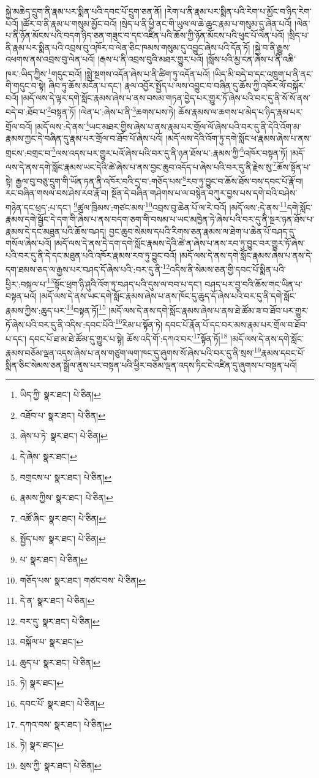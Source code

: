 སྐྱེ་མཆེད་དྲུག་ནི་རྣམ་པར་སྨིན་པའི་དབང་པོ་དྲུག་ཅན་ནོ། །རེག་པ་ནི་རྣམ་པར་སྨིན་པའི་རེག་པ་མྱོང་བ་ཉིད་རེག་པའོ། །ཚོར་བ་ནི་རྣམ་པ་གསུམ་མྱོང་བའོ། །སྲེད་པ་ནི་ཕྱི་ནང་གི་ཡུལ་ལ་ཆེ་ཆུང་རྣམ་པ་གསུམ་དུ་ཞེན་པའོ། །ལེན་པ་ནི་ཉོན་མོངས་པའི་བདག་ཉིད་ཅན་གཟུང་བ་དང་འཛིན་པའི་ཆོས་ཀྱི་ཉོན་མོངས་པའི་ཕུང་པོ་ལེན་པའོ། །སྲིད་པ་ནི་རྣམ་པར་སྨིན་པའི་འབྲས་བུ་འཁོར་བ་ལེན་ཅིང་ཁམས་གསུམ་དུ་འབྱུང་ཞེས་པའི་དོན་ཏོ། །སྐྱེ་བ་ནི་རྒྱུས་འཕགས་ནས་འབྲས་བུ་ལེན་པའོ། །རྒས་པ་ནི་འབྲས་བུའི་མཐར་གྱུར་པའོ། །སློས་པའི་མྱ་ངན་ཞེས་པ་ནི་འཆི་ཁར་:ཡིད་ཀྱིས་\footnote{ཡིད་ཀྱི་  སྣར་ཐང་།  པེ་ཅིན། }གདུང་བའོ། །སྨྲེ་སྔགས་འདོན་ཞེས་པ་ནི་ཚིག་ཏུ་འདོན་པའོ། །ཡིད་མི་བདེ་བ་དང་འཁྲུག་པ་ནི་ནང་གི་གདུང་བ་སྟེ། ཞིབ་ཏུ་ཆོས་མངོན་པ་དང་། རྣལ་འབྱོར་སྤྱོད་པ་ལས་འབྱུང་བ་བཞིན་དུ་ཆོས་ཀྱི་འཁོར་ལོ་བསྐོར་བའོ། །མདོ་ལས་དེ་ལྟར་དགེ་སློང་རྣམས་ཞེས་པ་ནས་བསམ་གཏན་བྱེད་པར་གྱུར་ཏོ་ཞེས་པའི་བར་དུ་ནི་སོ་སོ་ནས་བདེ་བ་:ཐོབ་པ་\footnote{འཐོབ་པ་  སྣར་ཐང་།  པེ་ཅིན། }བསྟན་ཏོ། །ལེན་པ་:ཞེས་པ་ནི་\footnote{ཞེས་པ་ཏེ་  སྣར་ཐང་།  པེ་ཅིན། }ཆགས་པས་ཏེ། ཆོས་རྣམས་ལ་ཆགས་པ་མེད་པ་ཉིད་རྣམ་པར་གྲོལ་བའོ། །མདོ་ལས་:དེ་ནས་\footnote{དེ་ཞེས་  སྣར་ཐང་། }ཡང་མཐར་གྱིས་ཞེས་པ་ནས་རྣམ་པར་གྲོལ་ལོ་ཞེས་པའི་བར་དུ་ནི་དེའི་འོག་མ་རྣམས་ཀྱང་དེ་བཞིན་དུ་རྣམ་པར་གྲོལ་བ་ཐོབ་པོ་ཞེས་པའོ། །མདོ་ལས་དེའི་འོག་ཏུ་དགེ་སློང་ཕ་རྣམས་ཞེས་པ་ནས་གྲངས་:བགྲང་བ་\footnote{བགྲངས་པ་  སྣར་ཐང་།  པེ་ཅིན། }ལས་འདས་པར་གྱུར་པའོ་ཞེས་པའི་བར་དུ་ནི་ཉན་ཐོས་པ་:རྣམས་ཀྱི་\footnote{རྣམས་ཀྱིས་  སྣར་ཐང་།  པེ་ཅིན། }འཁོར་བསྟན་ཏོ། །མདོ་ལས་དེ་ནས་དགེ་སློང་རྣམས་ཡང་དེའི་ཚེ་ཞེས་པ་ནས་བྱང་ཆུབ་འདོད་པ་ཞེས་པའི་བར་དུ་ནི་རྗེས་སུ་\footnote{འཚོ་ཞིང་  སྣར་ཐང་།  པེ་ཅིན། }ཆོས་སྟོན་པ་སྟེ། རྒྱལ་བུ་བཅུ་དྲུག་གི་ཡོན་ཏན་ནི་འཁོར་བའི་དྲ་བ་:གཅོད་པས་\footnote{སྤྱོད་པས་  སྣར་ཐང་།  པེ་ཅིན། }རབ་ཏུ་བྱུང་བ་ཆོས་ཐོས་བས་དབང་པོ་རྣོ་བ། རང་བཞིན་གསལ་བས་ཤེས་རབ་རྣོ་བ། སྔོན་དེ་བཞིན་གཤེགས་པ་ལ་བསྙེན་བཀུར་བྱས་པས་དགེ་བའི་བཤེས་གཉེན་དང་ཕྲད་:པ་དང་། \footnote{པ་  སྣར་ཐང་།  པེ་ཅིན། }ཚུལ་ཁྲིམས་:གཙང་མས་\footnote{གཅོད་པས་  སྣར་ཐང་། གཙང་བས་  པེ་ཅིན། }འབྲས་བུ་ཆེན་པོ་ལ་རེ་བའོ། །མདོ་ལས་:དེ་ནས་\footnote{དེ་ན་  སྣར་ཐང་།  པེ་ཅིན། }དགེ་སློང་རྣམས་དགེ་སྦྱོང་དེ་དག་གི་ཞེས་པ་ནས་བདག་ཅག་གི་བསམ་པ་ཡང་མཁྱེན་ཏེ་ཞེས་པའི་བར་དུ་ནི་སྔར་ཉན་ཐོས་པ་རྣམས་དེ་དང་མཐུན་པའི་ཆོས་བཤད། བྱང་ཆུབ་སེམས་དཔའི་རིགས་ཅན་རྣམས་ལ་ཐེག་པ་ཆེན་པོ་བཤད་དུ་གསོལ་ཞེས་པའོ། །མདོ་ལས་དེ་ནས་དེ་དག་དགེ་སློང་རྣམས་དེའི་ཚེ་ན་ཞེས་པ་ནས་རབ་ཏུ་བྱུང་བར་གྱུར་ཏོ་ཞེས་པའི་བར་དུ་ནི་དེ་དང་མཐུན་པའི་འཁོར་རྣམས་རབ་ཏུ་བྱུང་བའོ། །མདོ་ལས་དེ་ནས་དགེ་སློང་རྣམས་ཞེས་པ་ནས་དེ་དག་ཐམས་ཅད་ལ་རྒྱས་པར་བཤད་དོ་ཞེས་པའི་:བར་དུ་ནི་\footnote{བར་དུ་  སྣར་ཐང་།  པེ་ཅིན། }འདིས་ནི་སེམས་ཅན་གྱི་དབང་པོ་སྨིན་པའི་ཕྱིར་:བསྐལ་པ་\footnote{བསྐོལ་པ་  སྣར་ཐང་། }སྟོང་ཕྲག་ཉི་ཤུའི་འོག་ཏུ་བཤད་པའི་དུས་ལ་བབ་པ་དང་། བཤད་པར་བྱ་བའི་ཆོས་གང་ཡིན་པ་བསྟན་པའོ། །མདོ་ལས་དེ་ནས་ཡང་དགེ་སློང་རྣམས་ཞེས་པ་ནས་ཁོང་དུ་ཆུད་དོ་ཞེས་པའི་བར་དུ་ནི་དགེ་སློང་རྣམས་ཀྱིས་:ཆུད་པར་\footnote{ཆུད་པ་  སྣར་ཐང་།  པེ་ཅིན། }བསྟན་ཏོ།\footnote{ཏེ།  སྣར་ཐང་། } །མདོ་ལས་དེ་ནས་དགེ་སློང་རྣམས་ཞེས་པ་ནས་ཐེ་ཚོམ་ཟ་བ་ཐོབ་པར་གྱུར་ཏོ་ཞེས་པའི་བར་དུ་ནི་འདིས་:དབང་པོའི་\footnote{དབང་པོ་  སྣར་ཐང་།  པེ་ཅིན། }རིམ་པ་སྟོན་ཏེ། དབང་པོ་རྣོན་པོ་དང་བར་མས་རྣམ་པར་གྲོལ་བ་ཐོབ་པ་དང་། དབང་པོ་ཐ་མ་ཐེ་ཚོམ་དུ་གྱུར་པ་སྟེ། ཆོས་འདི་གོ་:དཀའ་བར་\footnote{དཀའ་བས་  སྣར་ཐང་།  པེ་ཅིན། }སྟོན་ཏོ།\footnote{ཏེ།  སྣར་ཐང་། } །མདོ་ལས་དེ་ནས་དགེ་སློང་རྣམས་བཅོམ་ལྡན་འདས་ཞེས་པ་ནས་གཙུག་ལག་ཁང་དུ་ཞུགས་སོ་ཞེས་པའི་བར་དུ་ནི་སྲས་\footnote{སྲས་ཀྱི་  སྣར་ཐང་།  པེ་ཅིན། }རྣམས་དབང་པོ་སྨིན་ཅིང་སེམས་ཅན་སྒྲོལ་ནུས་པར་བསྟན་པའི་ཕྱིར་བཅོམ་ལྡན་འདས་ཏིང་ངེ་འཛིན་དུ་ཞུགས་པ་བསྟན་པའོ། 